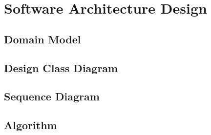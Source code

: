 \chapter{Software Architecture Design}
\label{chap:software-architecture-design}


\section{Domain Model}
\label{section:domain-model}


\section{Design Class Diagram}
\label{section:design-class-diagram}


\section{Sequence Diagram}
\label{section:sequence-diagram}



\section{Algorithm}
\label{section:algorithm}

